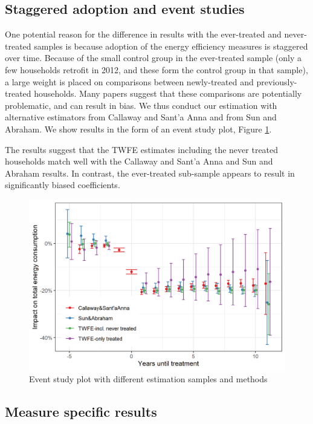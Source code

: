\documentclass{article}
\begin{document}
\subsection{Staggered adoption and event studies}
One potential reason for the difference in results with the ever-treated and never-treated samples is because adoption of the energy efficiency measures is staggered over time. Because of the small control group in the ever-treated sample (only a few households retrofit in 2012, and these form the control group in that sample), a large weight is placed on comparisons between newly-treated and previously-treated households. Many papers suggest that these comparisons are potentially problematic, and can result in bias.  We thus conduct our estimation with alternative estimators from Callaway and Sant'a Anna and from Sun and Abraham.  We show results in the form of an event study plot, Figure \ref{fig_esplot}.

The results suggest that the TWFE estimates including the never treated households match well with the Callaway and Sant'a Anna and Sun and Abraham results.  In contrast, the ever-treated sub-sample appears to result in significantly biased coefficients.

\begin{figure}
	\includegraphics{../output_figures_tables/event_study_plot}
	\caption{Event study plot with different estimation samples and methods}\label{fig_esplot}
\end{figure}


\subsection{Measure specific results}
\end{document}
